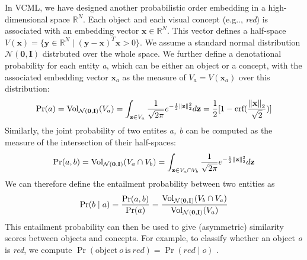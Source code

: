 \documentclass{article}
\makeatletter
\def\rvx{{\mathbf{x}}}
\def\rvy{{\mathbf{y}}}
\def\rvz{{\mathbf{z}}}
\DeclareRobustCommand\onedot{\futurelet\@let@token\@onedot}
\def\@onedot{\ifx\@let@token.\else.\null\fi\xspace}
\def\eg{e.g\onedot} \def\Eg{E.g\onedot}
\newcommand{\model}{VCML\xspace}
\makeatother
\begin{document}
In \model, we have designed another probabilistic order embedding in a high-dimensional space $\mathbb{R}^N$. Each object and each visual concept (\eg, {\it red}) is associated with an embedding vector $\rvx \in \mathbb{R}^N$. This vector defines a half-space $V(\rvx) = \{\rvy \in \mathbb{R}^N \mid (\rvy - \rvx)^T \rvx > 0\}$. We assume a standard normal distribution $\mathcal{N}(\mathbf{0}, \mathbf{I})$ distrbuted over the whole space. We further define a denotational probability for each entity {\it a}, which can be either an object or a concept, with the associated embedding vector $\rvx_a$ as the measure of $V_a = V(\rvx_a)$ over this distribution:
\[
    \Pr(a)  = \textnormal{Vol}_{\mathcal{N}(\mathbf{0}, \mathbf{I})} ( V_a )
            = \int_{\rvz \in V_a} {\frac{1}{\sqrt{2\pi}} e^{-\frac{1}{2} {\left\Vert \rvz \right\Vert}_2^2}d\rvz}
            = \frac{1}{2} [1-\text{erf} (\frac{{\left\Vert \rvx \right\Vert}_2}{\sqrt{2}})]
\]
Similarly, the joint probability of two entites {\it a, b} can be computed as the measure of the intersection of their half-spaces:
\[
    \Pr(a, b)   = \textnormal{Vol}_{\mathcal{N}(\mathbf{0}, \mathbf{I})}(V_a\cap V_b)
                = \int_{\rvz \in V_a \cap V_b} {\frac{1}{\sqrt{2\pi}} e^{-\frac{1}{2} {\left\Vert \rvz \right\Vert}_2^2}d\rvz}
\]
We can therefore define the entailment probability between two entities as
\[
    \Pr(b \mid a) 
    = \frac{\Pr(a,b)}{\Pr(a)} 
    = \frac {\textnormal{Vol}_{\mathcal{N}(\mathbf{0}, \mathbf{I})}(V_b \cap V_a)} {\textnormal{Vol}_{\mathcal{N}(\mathbf{0}, \mathbf{I})}(V_a)}
\]
This entailment probability can then be used to give (asymmetric) similarity scores between objects and concepts. For example, to classify whether an object {\it o} is {\it red}, we compute
$\Pr(\text{object}\ o\ \text{is}\ red) = \Pr(red \mid o)$ .
\end{document}
